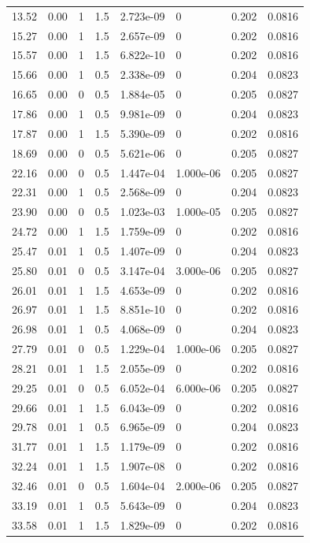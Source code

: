 \documentclass[preview]{standalone}
\begin{document}
{{\begin{tabular}{L{1.2cm}C{1.2cm} C{0.3cm}C{0.5cm} C{1.4cm}C{1.4cm} C{1.4cm}C{1.4cm}}
  13.52  &  0.00  & 1     & 1.5 &  2.723e-09  & 0  & 0.202 &  0.0816   \\ 
  15.27  &  0.00  & 1     & 1.5 &  2.657e-09  & 0  & 0.202 &  0.0816   \\ 
  15.57  &  0.00  & 1     & 1.5 &  6.822e-10  & 0  & 0.202 &  0.0816   \\ 
  15.66  &  0.00  & 1     & 0.5 &  2.338e-09  & 0  & 0.204 &  0.0823   \\ 
  16.65  &  0.00  & 0     & 0.5 &  1.884e-05  & 0  & 0.205 &  0.0827   \\ 
  17.86  &  0.00  & 1     & 0.5 &  9.981e-09  & 0  & 0.204 &  0.0823   \\ 
  17.87  &  0.00  & 1     & 1.5 &  5.390e-09  & 0  & 0.202 &  0.0816   \\ 
  18.69  &  0.00  & 0     & 0.5 &  5.621e-06  & 0  & 0.205 &  0.0827   \\ 
  22.16  &  0.00  & 0     & 0.5 &  1.447e-04  & 1.000e-06  & 0.205 &  0.0827   \\ 
  22.31  &  0.00  & 1     & 0.5 &  2.568e-09  & 0  & 0.204 &  0.0823   \\ 
  23.90  &  0.00  & 0     & 0.5 &  1.023e-03  & 1.000e-05  & 0.205 &  0.0827   \\ 
  24.72  &  0.00  & 1     & 1.5 &  1.759e-09  & 0  & 0.202 &  0.0816   \\ 
  25.47  &  0.01  & 1     & 0.5 &  1.407e-09  & 0  & 0.204 &  0.0823   \\ 
  25.80  &  0.01  & 0     & 0.5 &  3.147e-04  & 3.000e-06  & 0.205 &  0.0827   \\ 
  26.01  &  0.01  & 1     & 1.5 &  4.653e-09  & 0  & 0.202 &  0.0816   \\ 
  26.97  &  0.01  & 1     & 1.5 &  8.851e-10  & 0  & 0.202 &  0.0816   \\ 
  26.98  &  0.01  & 1     & 0.5 &  4.068e-09  & 0  & 0.204 &  0.0823   \\ 
  27.79  &  0.01  & 0     & 0.5 &  1.229e-04  & 1.000e-06  & 0.205 &  0.0827   \\ 
  28.21  &  0.01  & 1     & 1.5 &  2.055e-09  & 0  & 0.202 &  0.0816   \\ 
  29.25  &  0.01  & 0     & 0.5 &  6.052e-04  & 6.000e-06  & 0.205 &  0.0827   \\ 
  29.66  &  0.01  & 1     & 1.5 &  6.043e-09  & 0  & 0.202 &  0.0816   \\ 
  29.78  &  0.01  & 1     & 0.5 &  6.965e-09  & 0  & 0.204 &  0.0823   \\ 
  31.77  &  0.01  & 1     & 1.5 &  1.179e-09  & 0  & 0.202 &  0.0816   \\ 
  32.24  &  0.01  & 1     & 1.5 &  1.907e-08  & 0  & 0.202 &  0.0816   \\ 
  32.46  &  0.01  & 0     & 0.5 &  1.604e-04  & 2.000e-06  & 0.205 &  0.0827   \\ 
  33.19  &  0.01  & 1     & 0.5 &  5.643e-09  & 0  & 0.204 &  0.0823   \\ 
  33.58  &  0.01  & 1     & 1.5 &  1.829e-09  & 0  & 0.202 &  0.0816   \\ 
\hline 
\end{tabular} 

}}
\end{document}
